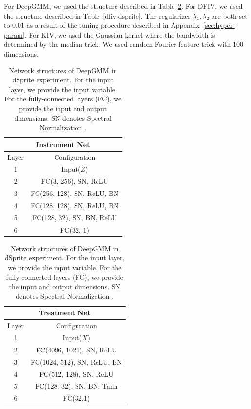 For DeepGMM, we used the structure described in Table~\ref{deepgmm-dsprite}. For DFIV, we used the structure described in Table~\ref{dfiv-dsprite}. The regularizer $\lambda_1, \lambda_2$ are both set to 0.01 as a result of the tuning procedure described in Appendix~\ref{sec:hyper-param}. For KIV, we used the Gaussian kernel where the bandwidth is determined by the median trick. We used random Fourier feature trick \citep{Rahimi2008} with 100 dimensions. 

\begingroup
\renewcommand{\arraystretch}{1.2}
\begin{table}[t]
    \caption{Network structures of DeepGMM in dSprite experiment.  For the input layer, we provide the input variable. For the fully-connected layers (FC), we provide the input and output dimensions. SN denotes Spectral Normalization \citep{Miyato2018}.}
    
    \label{deepgmm-dsprite}
    \centering
    
    \begin{minipage}{0.48\hsize}
        \centering
        \begin{tabular}{cc}
            \multicolumn{2}{c}{\bf Instrument Net} 
            \\ \hline
            Layer & Configuration \\ \hline
            1 & Input($Z$) \\ \hline
            2 & FC(3, 256), SN, ReLU\\ \hline
            3 & FC(256, 128), SN, ReLU, BN \\ \hline
            4 & FC(128, 128), SN, ReLU, BN \\ \hline
            5 & FC(128, 32), SN, BN, ReLU \\ \hline
            6 & FC(32, 1)\\ \hline
            \end{tabular}    
    \end{minipage}
    \hfill
    \begin{minipage}{0.48\hsize}
        \centering
        \begin{tabular}{cc}
            \multicolumn{2}{c}{\bf Treatment Net} 
            \\ \hline
            Layer & Configuration \\ \hline
            1 & Input($X$) \\ \hline
            2 & FC(4096, 1024), SN, ReLU \\ \hline
            3 & FC(1024, 512), SN, ReLU, BN \\ \hline
            4 & FC(512, 128), SN,  ReLU \\ \hline
            5 & FC(128, 32), SN, BN, Tanh\\ \hline
            6 & FC(32,1)\\ \hline
            \end{tabular}    
    \end{minipage}
    
\end{table}
\endgroup  


